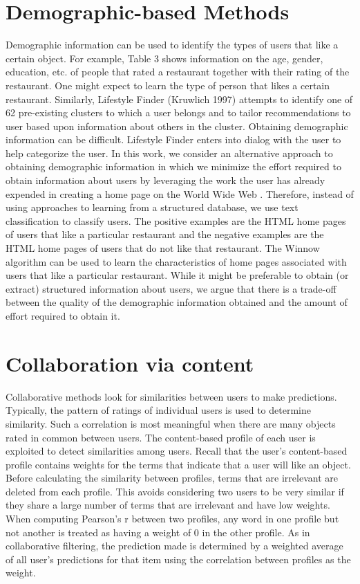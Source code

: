 \section{Demographic-based Methods}
Demographic information can be used to identify the types of users that like a certain object. For example, Table 3 shows information on the age, gender, education, etc. of people that rated a restaurant together with their rating of the restaurant. One might expect to learn the type of person that likes a certain restaurant. Similarly, Lifestyle Finder (Kruwlich 1997) attempts to identify one of 62 pre-existing clusters to which a user belongs and to tailor recommendations to user based upon information about others in the cluster. Obtaining demographic information can be difficult. Lifestyle Finder enters into dialog with the user to help categorize the user.
In this work, we consider an alternative approach to obtaining demographic information in which we minimize the effort required to obtain information about users by leveraging the work the user has already expended in creating a home page on the World Wide Web . Therefore, instead of using approaches to learning from a structured database, we use text classification to classify users. The positive examples are the HTML home pages of users that like a particular restaurant and the negative examples are the HTML home pages of users that do not like that restaurant. The Winnow algorithm can be used to learn the characteristics of home pages associated with users that like a particular restaurant. While it might be preferable to obtain (or extract) structured information about users, we argue that there is a trade-off between the quality of the demographic information obtained and the amount of effort required to obtain it.

\section{Collaboration via content}
Collaborative methods look for similarities between users to make predictions. Typically, the pattern of ratings of individual users is used to determine similarity. Such a correlation is most meaningful when there are many objects rated in common between users.
The content-based profile of each user is exploited to detect similarities among users. Recall that the user’s content-based profile contains weights for the terms that indicate that a user will like an object. Before calculating the similarity between profiles, terms that are irrelevant are deleted from each profile. This avoids considering two users to be very similar if they share a large number of terms that are irrelevant and have low weights. When computing Pearson’s r between two profiles, any word in one profile but not another is treated as having a weight of 0 in the other profile. As in collaborative filtering, the prediction made is determined by a weighted average of all user’s predictions for that item using the correlation between profiles as the weight.

